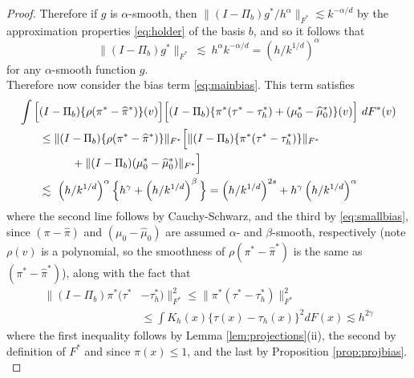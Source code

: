 \documentclass[11pt,twoside]{article}
\newcommand{\Holder}{\text{H\"{o}lder}}
\theoremstyle{definition}
\theoremstyle{remark}
\begin{document}
\begin{proof}
Therefore if $g$ is $\alpha$-smooth, then 
$\| (I - \Pi_b) g^*/h^\alpha \|_{F^*} \lesssim k^{-\alpha/d}$
by the \Holder{} approximation properties \eqref{eq:holder} of the basis $b$, and so it follows that
\begin{equation}
\| (I - \Pi_b) g^* \|_{F^*} \ \lesssim \ h^\alpha k^{-\alpha/d} = \left(h/k^{1/d} \right)^{\alpha} \label{eq:smallbias}
\end{equation}
for any $\alpha$-smooth function $g$. \\


Therefore now consider the bias term \eqref{eq:mainbias}. 
This term satisfies
\begin{align*}
\int \Big[ &(I- \Pi_{b})\{\rho(\pi^*-\widehat\pi^*)\}(v) \Big] \Big[ (I-\Pi_{b}) \{ \pi^* ( \tau^* - \tau_h^* ) + (\mu_0^*-\widehat\mu_0^*)\}(v) \Big] \ dF^*(v) \\
&\leq \| (I-\Pi_{b}) \{\rho(\pi^*-\widehat\pi^*)\}  \|_{F^*} \Big[ \| (I-\Pi_{b})\{\pi^*(\tau^*-\tau_h^*) \} \|_{F^*}  \\
& \hspace{.4in} + \| (I-\Pi_{b})(\mu_0^*-\widehat\mu_0^*) \|_{F^*}  \Big] \\
&  \lesssim  \  \left(h/k^{1/d}\right)^{\alpha} \Big\{ h^\gamma  + \left(h/k^{1/d}\right)^\beta \Big\} = \left(h/k^{1/d}\right)^{2s} +h^\gamma \left(h/k^{1/d}\right)^\alpha
\end{align*}
where the second line follows by Cauchy-Schwarz, and the third by \eqref{eq:smallbias}, 
since $(\pi-\widehat\pi)$ and  $(\mu_0-\widehat\mu_0)$ are assumed $\alpha$- and $\beta$-smooth, respectively (note $\rho(v)$ is a polynomial, so the smoothness of $\rho(\pi^*-\widehat\pi^*)$ is the same as $(\pi^*-\widehat\pi^*)$), along with the fact that
\begin{align*}
\| (I-\Pi_{b}) \pi^* ( \tau^* &- \tau_h^* ) \|_{F^*}^2 \leq \|  \pi^* ( \tau^* - \tau_h^* ) \|_{F^*}^2 \\
&\leq \int K_h(x) \Big\{ \tau(x) - \tau_h(x) \Big\}^2 dF(x) \lesssim h^{2\gamma}
\end{align*}
where the first inequality follows by Lemma \ref{lem:projections}(ii), the second by definition of $F^*$ and since $\pi(x) \leq 1$, and the last by Proposition \ref{prop:projbias}. \\


\end{proof}
\end{document}
